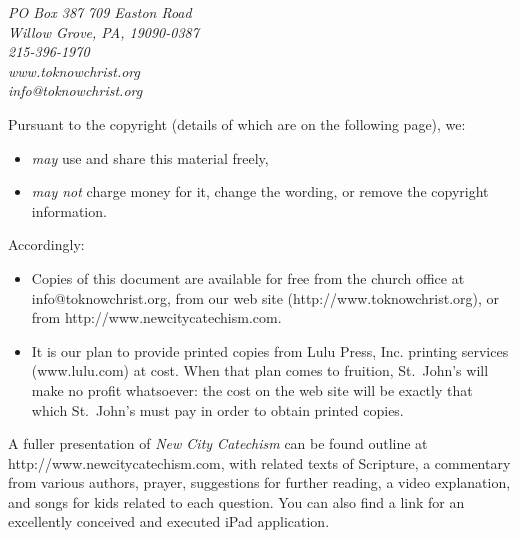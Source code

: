 \documentclass[titlepage]{memoir}
\begin{document}
\vspace{-1em}

\begin{center}
\emph{PO Box 387\,\textbullet\,709 Easton Road\\
Willow Grove, PA, 19090-0387\\
215-396-1970\\
www.toknowchrist.org\\
info@toknowchrist.org}
\end{center}

Pursuant to the copyright (details of which are on the following page), we:

\begin{itemize}
	\item {\em may}\/ use and share this material freely,
	\item {\em may not}\/ charge money for it, change the wording, or remove the copyright information.
\end{itemize}

Accordingly:

\begin{itemize}
	\item Copies of this document are available for free from the church office at info@to\hspace{0em}know\hspace{0em}christ.\hspace{0em}org, from our web site (http:\slash{}\slash{}www.to\hspace{0em}know\hspace{0em}christ.org), or from http:\slash{}\slash{}www.new\hspace{0em}city\hspace{0em}cate\hspace{0em}chism.\hspace{0em}com.
	\item It is our plan to provide printed copies from Lulu Press, Inc. printing services (www.lulu.com) at cost. When that plan comes to fruition, St.\ John's will make no profit whatsoever: the cost on the web site will be exactly that which St.\ John's must pay in order to obtain printed copies.
\end{itemize}

A fuller presentation of {\em New City Catechism}\/ can be found outline at http:\slash{}\slash{}www.new\hspace{0em}city\hspace{0em}cat\hspace{0em}echism.\hspace{0em}com, with related texts of Scripture, a commentary from various authors, prayer, suggestions for further reading, a video explanation, and songs for kids related to each question. You can also find a link for an excellently conceived and executed iPad application.
\end{document}
